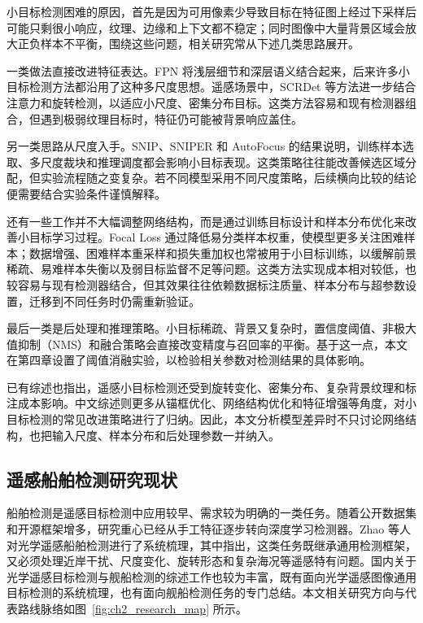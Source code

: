 小目标检测困难的原因，首先是因为可用像素少导致目标在特征图上经过下采样后可能只剩很小响应，纹理、边缘和上下文都不稳定；同时图像中大量背景区域会放大正负样本不平衡，围绕这些问题，相关研究常从下述几类思路展开。

一类做法直接改进特征表达。FPN\cite{lin2017_fpn} 将浅层细节和深层语义结合起来，后来许多小目标检测方法都沿用了这种多尺度思想。遥感场景中，SCRDet\cite{yang2019_scrdet} 等方法进一步结合注意力和旋转检测，以适应小尺度、密集分布目标。这类方法容易和现有检测器组合，但遇到极弱纹理目标时，特征仍可能被背景响应盖住。

另一类思路从尺度入手。SNIP\cite{singh2018_snip}、SNIPER\cite{singh2018_sniper} 和 AutoFocus\cite{najibi2019_autofocus} 的结果说明，训练样本选取、多尺度裁块和推理调度都会影响小目标表现。这类策略往往能改善候选区域分配，但实验流程随之变复杂。若不同模型采用不同尺度策略，后续横向比较的结论便需要结合实验条件谨慎解释。

还有一些工作并不大幅调整网络结构，而是通过训练目标设计和样本分布优化来改善小目标学习过程。Focal Loss\cite{lin2017_focalloss} 通过降低易分类样本权重，使模型更多关注困难样本；数据增强、困难样本重采样和损失重加权也常被用于小目标训练，以缓解前景稀疏、易难样本失衡以及弱目标监督不足等问题。这类方法实现成本相对较低，也较容易与现有检测器结合，但其效果往往依赖数据标注质量、样本分布与超参数设置，迁移到不同任务时仍需重新验证。

最后一类是后处理和推理策略。小目标稀疏、背景又复杂时，置信度阈值、非极大值抑制（NMS）和融合策略会直接改变精度与召回率的平衡。基于这一点，本文在第四章设置了阈值消融实验，以检验相关参数对检测结果的具体影响。

已有综述\cite{wang2023_sod_review,cheng2016_rsod_survey}也指出，遥感小目标检测还受到旋转变化、密集分布、复杂背景纹理和标注成本影响。中文综述则更多从锚框优化、网络结构优化和特征增强等角度，对小目标检测的常见改进策略进行了归纳\cite{du2022_small_object_review_cn,liao2023_small_target_review_cn}。因此，本文分析模型差异时不只讨论网络结构，也把输入尺度、样本分布和后处理参数一并纳入。

\subsection{遥感船舶检测研究现状}


船舶检测是遥感目标检测中应用较早、需求较为明确的一类任务。随着公开数据集和开源框架增多，研究重心已经从手工特征逐步转向深度学习检测器。Zhao 等人\cite{zhao2024_shipsurvey} 对光学遥感船舶检测进行了系统梳理，其中指出，这类任务既继承通用检测框架，又必须处理近岸干扰、尺度变化、旋转形态和复杂海况等遥感特有问题。国内关于光学遥感目标检测与舰船检测的综述工作也较为丰富，既有面向光学遥感图像通用目标检测的系统梳理\cite{nie2021_optical_rs_detection_cn,liao2022_optical_rs_detection_cn}，也有面向舰船检测任务的专门总结\cite{wang2011_ship_detection_cn,xu2021_vessel_detection_cn,song2021_ship_survey_cn,huang2023_ship_detection_survey_cn,li2021_ship_detection_review_cn}。本文相关研究方向与代表路线脉络如图~\ref{fig:ch2_research_map} 所示。

